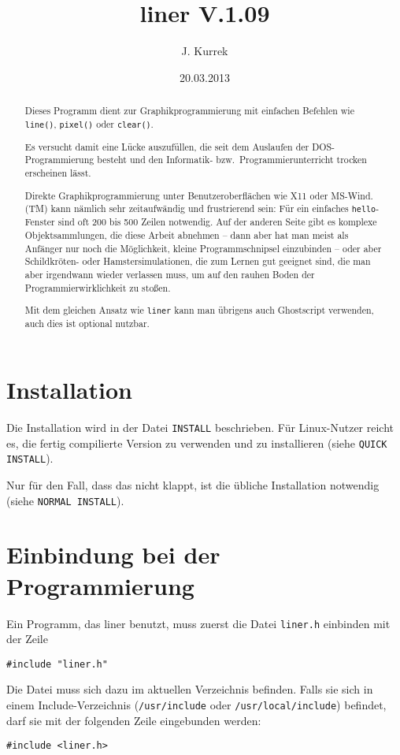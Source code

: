 \documentclass{article}
\begin{document}
\title{liner V.1.09}
\author{J. Kurrek}
\date{20.03.2013}
\maketitle
\begin{abstract}
Dieses Programm dient zur Graphikprogrammierung
mit einfachen Befehlen wie \verb_line()_,
\verb_pixel()_ oder \verb_clear()_.

Es versucht damit eine L\"ucke auszuf\"ullen, die seit
dem Auslaufen der DOS-Programmierung besteht
und den Informatik- bzw.~Programmierunterricht
trocken erscheinen l\"asst.

Direkte Graphikprogrammierung unter Benutzeroberfl\"achen
wie X11 oder MS-Wind.(TM) kann n\"amlich sehr zeitaufw\"andig
und frustrierend sein: F\"ur ein einfaches 
\verb_hello_-Fenster sind oft 200 bis 500 Zeilen notwendig. 
Auf der anderen Seite gibt es komplexe Objektsammlungen,
die diese Arbeit abnehmen -- dann aber hat man meist 
als Anf\"anger nur noch die M\"oglichkeit, kleine
Programmschnipsel einzubinden -- oder aber Schildkr\"oten- oder
Hamstersimulationen, die zum Lernen gut geeignet sind, 
die man aber irgendwann wieder verlassen muss, um auf
den rauhen Boden der Programmierwirklichkeit zu sto\ss{}en.

Mit dem gleichen Ansatz wie \verb_liner_ kann man \"ubrigens
auch Ghostscript verwenden, auch dies ist optional nutzbar.
\end{abstract}
\section{Installation}
Die Installation wird in der Datei \verb_INSTALL_ beschrieben.
F\"ur Linux-Nutzer reicht es, die fertig compilierte
Version zu verwenden und zu installieren (siehe \verb_QUICK INSTALL_).

Nur f\"ur den Fall, dass das nicht klappt, ist die \"ubliche
Installation notwendig (siehe \verb_NORMAL INSTALL_).
\section{Einbindung bei der Programmierung}
Ein Programm, das liner benutzt, muss zuerst
die Datei \verb_liner.h_ einbinden mit der Zeile
\begin{verbatim}
#include "liner.h"
\end{verbatim}
Die Datei muss sich dazu im aktuellen Verzeichnis
befinden. Falls sie sich in einem Include-Verzeichnis
(\verb_/usr/include_ oder \verb_/usr/local/include_)
befindet, darf sie mit der folgenden Zeile
eingebunden werden:
\begin{verbatim}
#include <liner.h>
\end{verbatim}
\end{document}
